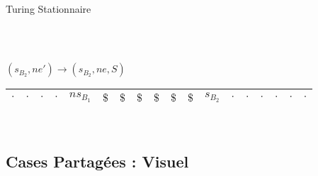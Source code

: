 \documentclass[12pt]{beamer}
\begin{document}
\begin{frame}{Turing Stationnaire}
\begin{center}
\begin{tabular}{|c|c|c|c|c|c|c|c|c|c|c|c|c|c|c|c|c|c|}
\end{tabular}\\

\pause
\pause
\pause
\pause
\pause
\pause

\vspace{0.5cm}

    $(s_{B_2},ne') \longrightarrow (s_{B_2}, ne, S)$\\



    
\begin{tabular}{|c|c|c|c|c|c|c|c|c|c|c|c|c|c|c|c|c|c|}\hline
     $\cdot$ & $\cdot$ & $\cdot$ & $\cdot$ & $ns_{B_1}$ & $\$$ & $\$$ & $\$$ & $\$$ & $\$$ & $\$$ & $s_{B_2}$ & $\cdot$ & $\cdot$ & $\cdot$ & $\cdot$ & $\cdot$ & $\cdot$ \\\hline    
     
\end{tabular}\\

    \end{center}
\end{frame}

\subsection{Cases Partagées : Visuel}
\end{document}
